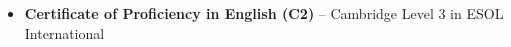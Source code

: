 






\begin{itemize}
    \item \textbf{Certificate of Proficiency in English (C2)} -- Cambridge Level 3 in ESOL International
\end{itemize}





